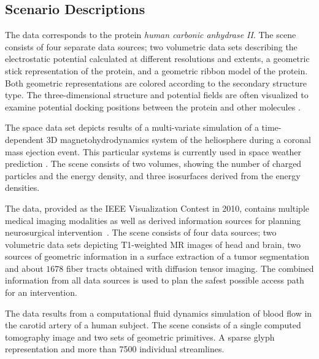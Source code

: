 \documentclass{egpubl}
\begin{document}
\subsection{Scenario Descriptions}
\label{sec:scenarios}

\begin{description}[font=\normalfont\itshape]
\item[Figure~\ref{fig:protein}, protein:]%
  The data corresponds to the protein \emph{human carbonic anhydrase II}.
  The scene consists of four separate data sources; two volumetric data sets describing the electrostatic potential calculated at different resolutions and extents, a geometric stick representation of the protein, and a geometric ribbon model of the protein.
  Both geometric representations are colored according to the secondary structure type.
  The three-dimensional structure and potential fields are often visualized to examine potential docking positions between the protein and other molecules \cite{Seeliger2010}.

\item[Figure~\ref{fig:space}, space:]%
  The space data set depicts results of a multi-variate simulation of a time-dependent 3D magnetohydrodynamics system of the heliosphere during a coronal mass ejection event.
  This particular systems is currently used in space weather prediction \cite{Xie2004}.
  The scene consists of two volumes, showing the number of charged particles and the energy density, and three isosurfaces derived from the energy densities.

\item[Figure~\ref{fig:neuro}, medical:]%
  The data, provided as the IEEE Visualization Contest in 2010, contains multiple medical imaging modalities as well as derived information sources for planning neurosurgical intervention~\cite{VisContest2010}.
  The scene consists of four data sources; two volumetric data sets depicting T1-weighted MR images of head and brain, two sources of geometric information in a surface extraction of a tumor segmentation and about $1678$ fiber tracts obtained with diffusion tensor imaging. 
  The combined information from all data sources is used to plan the safest possible access path for an intervention.

\item[Figure~\ref{fig:flow}, cfd:]%
  The data results from a computational fluid dynamics simulation of blood flow in the carotid artery of a human subject.
  The scene consists of a single computed tomography image and two sets of geometric primitives.
  A sparse glyph representation and more than 7500 individual streamlines. 
\end{description}
\end{document}

